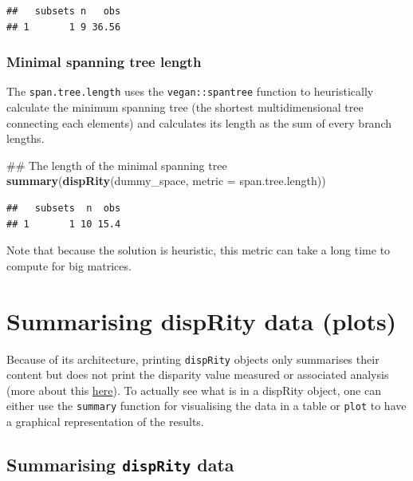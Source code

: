 \documentclass[]{book}
\newenvironment{Shaded}{\begin{snugshade}}{\end{snugshade}}
\newcommand{\KeywordTok}[1]{\textcolor[rgb]{0.13,0.29,0.53}{\textbf{#1}}}
\newcommand{\DataTypeTok}[1]{\textcolor[rgb]{0.13,0.29,0.53}{#1}}
\newcommand{\NormalTok}[1]{#1}
\theoremstyle{definition}
\theoremstyle{definition}
\theoremstyle{definition}
\theoremstyle{remark}
\begin{document}
\begin{verbatim}
##   subsets n   obs
## 1       1 9 36.56
\end{verbatim}

\subsubsection{Minimal spanning tree
length}\label{minimal-spanning-tree-length}

The \texttt{span.tree.length} uses the \texttt{vegan::spantree} function
to heuristically calculate the minimum spanning tree (the shortest
multidimensional tree connecting each elements) and calculates its
length as the sum of every branch lengths.

\begin{Shaded}
\begin{Highlighting}[]
\NormalTok{## The length of the minimal spanning tree}
\KeywordTok{summary}\NormalTok{(}\KeywordTok{dispRity}\NormalTok{(dummy_space, }\DataTypeTok{metric =}\NormalTok{ span.tree.length))}
\end{Highlighting}
\end{Shaded}

\begin{verbatim}
##   subsets  n  obs
## 1       1 10 15.4
\end{verbatim}

Note that because the solution is heuristic, this metric can take a long
time to compute for big matrices.

\section{Summarising dispRity data
(plots)}\label{summarising-disprity-data-plots}

Because of its architecture, printing \texttt{dispRity} objects only
summarises their content but does not print the disparity value measured
or associated analysis (more about this
\protect\hyperlink{manipulating-dispRity-objects}{here}). To actually
see what is in a dispRity object, one can either use the
\texttt{summary} function for visualising the data in a table or
\texttt{plot} to have a graphical representation of the results.

\subsection{\texorpdfstring{Summarising \texttt{dispRity}
data}{Summarising dispRity data}}\label{summarising-disprity-data}
\end{document}

